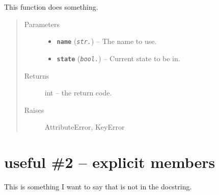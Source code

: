 \documentclass[letterpaper,10pt,english]{sphinxmanual}
\begin{document}
\begin{fulllineitems}
\label{code:an_example_pypi_project.useful_1.public_fn_with_sphinxy_docstring}
This function does something.
\begin{quote}\begin{description}
\item[{Parameters}] \leavevmode\begin{itemize}
\item {} 
\textbf{\texttt{name}} (\emph{\texttt{str.}}) -- The name to use.

\item {} 
\textbf{\texttt{state}} (\emph{\texttt{bool.}}) -- Current state to be in.

\end{itemize}

\item[{Returns}] \leavevmode
int -- the return code.

\item[{Raises}] \leavevmode
AttributeError, KeyError

\end{description}\end{quote}

\end{fulllineitems}



\chapter{useful \#2 -- explicit members}
\label{code:useful-2-explicit-members}
This is something I want to say that is not in the docstring.
\label{code:module-an_example_pypi_project.useful_2}\label{code:module-useful_1}
\end{document}
